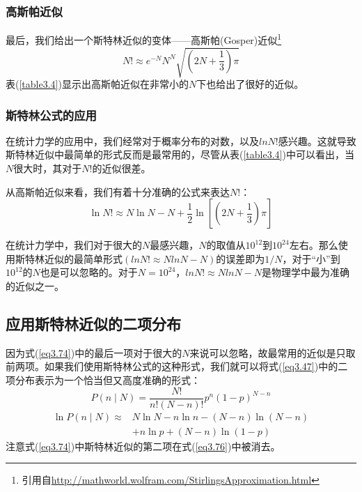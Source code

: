 \documentclass[UTF8]{ctexart}
\numberwithin{equation}{section}%
\numberwithin{figure}{section}%
\begin{document}
    \subsubsection{高斯帕近似}
    最后，我们给出一个斯特林近似的变体——高斯帕(Gosper)近似\footnote{引用自\href{http://mathworld.wolfram.com/StirlingsApproximation.html}{http://mathworld.wolfram.com/StirlingsApproximation.html}}
        \begin{equation}\label{eq3.73}
            N ! \approx e^{-N} N^{N} \sqrt{\left(2 N+\frac{1}{3}\right) \pi}
        \end{equation}
    表(\ref{table3.4})显示出高斯帕近似在非常小的$N$下也给出了很好的近似。
    \subsubsection{斯特林公式的应用}
    在统计力学的应用中，我们经常对于概率分布的对数，以及$lnN!$感兴趣。这就导致斯特林近似中最简单的形式反而是最常用的，尽管从表(\ref{table3.4})中可以看出，当$N$很大时，其对于$N!$的近似很差。

    从高斯帕近似来看，我们有着十分准确的公式来表达$N!$：
    \begin{equation}\label{eq3.74}
        \ln N ! \approx N \ln N-N+\frac{1}{2} \ln \left[\left(2 N+\frac{1}{3}\right) \pi\right]
    \end{equation}

    在统计力学中，我们对于很大的$N$最感兴趣，$N$的取值从$10^{12}$到$10^{24}$左右。那么使用斯特林近似的最简单形式\((lnN!\approx NlnN-N)\)的误差即为$1/N$，对于“小”到$10^{12}$的$N$也是可以忽略的。对于$N=10^{24}$，$lnN!\approx NlnN-N$是物理学中最为准确的近似之一。

    \subsection{应用斯特林近似的二项分布}
    因为式(\ref{eq3.74})中的最后一项对于很大的$N$来说可以忽略，故最常用的近似是只取前两项。如果我们使用斯特林公式的这种形式，我们就可以将式(\ref{eq3.47})中的二项分布表示为一个恰当但又高度准确的形式：
    \begin{equation}
        P(n \mid N)=\frac{N !}{n !(N-n) !} p^{n}(1-p)^{N-n}
    \end{equation}
    \begin{equation}\label{eq3.76}
        \begin{aligned}
            \ln P(n \mid N) \approx & N \ln N-n \ln n-(N-n) \ln (N-n) \\
            &+n \ln p+(N-n) \ln (1-p)
            \end{aligned}
    \end{equation}
    注意式(\ref{eq3.74})中斯特林近似的第二项在式(\ref{eq3.76})中被消去。
\end{document}
